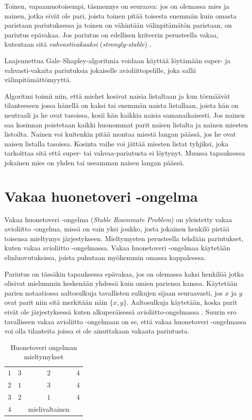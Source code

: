\documentclass[finnish]{tktltiki2}
\theoremstyle{definition}
\theoremstyle{remark}
\begin{document}
Toinen, vapaamuotoisempi, täsmennys on seuraava: jos on olemassa mies ja nainen, jotka eivät ole pari, joista toinen pitää toisesta enemmän kuin omasta paristaan pariutuksessa ja toinen on vähintään välinpitämätön paristaan, on pariutus epävakaa. Jos pariutus on edellisen kriteerin perusteella vakaa, kutsutaan sitä \emph{vahvastivakaaksi} (\emph{strongly-stable}) \cite{gusfield1989stable}.

Laajennettua Gale--Shapley-algoritmia voidaan käyttää löytämään super- ja vahvasti-vakaita pariutuksia jokaiselle avioliittopelille, joka sallii välinpitämättömyyttä.

Algoritmi toimii niin, että miehet kosivat naisia listaltaan ja kun törmäävät tilanteeseen jossa hänellä on kaksi tai enemmän naista listallaan, joista hän on neutraali ja he ovat tasoissa, kosii hän kaikkia naisia samanaikaisesti. Jos nainen saa kosinnan poistetaan kaikki huonommat parit naisen listalta ja nainen miesten listoilta. Nainen voi kuitenkin pitää montaa miestä langan päässä, jos he ovat naisen listalla tasoissa. Kosinta vaihe voi jättää miesten listat tyhjiksi, joka tarkoittaa sitä että super- tai vahvaa-pariutusta ei löytynyt. Muussa tapauksessa jokainen mies on yhden tai useamman naisen langan päässä.

\section{Vakaa huonetoveri -ongelma}
Vakaa huonetoveri -ongelma (\emph{Stable Roommate Problem}) on yleistetty vakaa avioliitto -ongelma, missä on vain yksi joukko, josta jokainen henkilö pistää toisensa mieltymys järjestykseen. Mieltymysten perusteella tehdään pariutukset, kuten vakaa avioliitto -ongelmassa. Vakaa huonetoveri -ongelmaa käytetään elinluovutuksissa, joista puhutaan myöhemmin omassa kappaleessa.

Pariutus on tässäkin tapauksessa epävakaa, jos on olemassa kaksi henkilöä jotka olisivat mielummin keskenään yhdessä kuin omien pariensa kanssa. Käytetään parien notaatiossa aaltosulkuja tavallisten sulkujen sijaan seuraavasti, jos $x$ ja $y$ ovat parit niin sitä merkitään näin $\{x, y\}$. Aaltosulkuja käytetään, koska parit eivät ole järjestyksessä kuten alkuperäisessä avioliitto-ongelmassa \cite{gusfield1989stable}. Suurin ero tavalliseen vakaa avioliitto -ongelmaan on se, että vakaa huonetoveri -ongelmassa voi olla tilanteita joissa ei ole ainuttakaan vakaata pariutusta.

\begin{table}[t]
\begin{center}
	\begin{tabular}{ l | *{2}{c} r }
	 &  \\
	 \hline
 	 $1$ & $3$ & $2$ & $4$ \\
 	 $2$ & $1$ & $3$ & $4$ \\
 	 $3$ & $2$ & $1$ & $4$ \\
 	 $4$ & &mielivaltainen
	\end{tabular}
	\caption{Huonetoveri ongelman mieltymykset \cite{gusfield1989stable}}
	\label{room-table}
\end{center}
\end{table}
\end{document}
